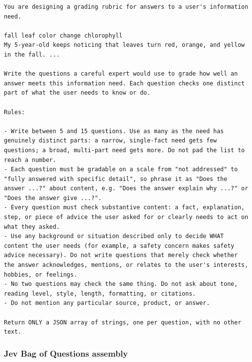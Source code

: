 \documentclass[
  10pt,
]{article}
\begin{document}
\begin{lstlisting}
You are designing a grading rubric for answers to a user's information need.

fall leaf color change chlorophyll
My 5-year-old keeps noticing that leaves turn red, orange, and yellow in the fall. ...

Write the questions a careful expert would use to grade how well an answer meets this information need. Each question checks one distinct part of what the user needs to know or do.

Rules:

- Write between 5 and 15 questions. Use as many as the need has genuinely distinct parts: a narrow, single-fact need gets few questions; a broad, multi-part need gets more. Do not pad the list to reach a number.
- Each question must be gradable on a scale from "not addressed" to "fully answered with specific detail", so phrase it as "Does the answer ...?" about content, e.g. "Does the answer explain why ...?" or "Does the answer give ...?".
- Every question must check substantive content: a fact, explanation, step, or piece of advice the user asked for or clearly needs to act on what they asked.
- Use any background or situation described only to decide WHAT content the user needs (for example, a safety concern makes safety advice necessary). Do not write questions that merely check whether the answer acknowledges, mentions, or relates to the user's interests, hobbies, or feelings.
- No two questions may check the same thing. Do not ask about tone, reading level, style, length, formatting, or citations.
- Do not mention any particular source, product, or answer.

Return ONLY a JSON array of strings, one per question, with no other text.
\end{lstlisting}

\subsubsection{Jev Bag of Questions
assembly}\label{jev-bag-of-questions-assembly}
\end{document}
